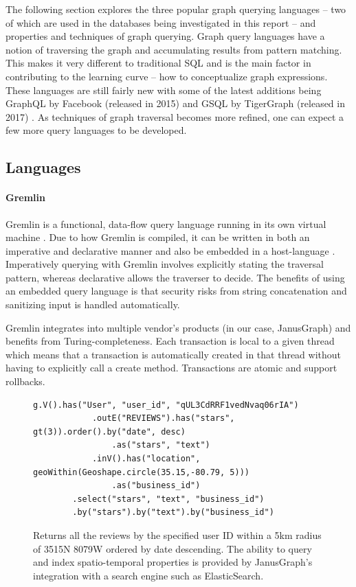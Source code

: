 The following section explores the three popular graph querying languages -- two of which are used in the databases being investigated in this report -- and properties and techniques of graph querying. Graph query languages have a notion of traversing the graph and accumulating results from pattern matching. This makes it very different to traditional SQL and is the main factor in contributing to the learning curve -- how to conceptualize graph expressions. These languages are still fairly new with some of the latest additions being GraphQL by Facebook (released in 2015) \cite{graphqlhome} and GSQL by TigerGraph (released in 2017) \cite{tgv1docs}. As techniques of graph traversal becomes more refined, one can expect a few more query languages to be developed.

\subsection{Languages}
\label{subsec:lang}

\paragraph{Gremlin}

Gremlin is a functional, data-flow query language running in its own virtual machine \cite{gremlin-tinkerpop}. Due to how Gremlin is compiled, it can be written in both an imperative and declarative manner and also be embedded in a host-language \cite{tinkerpop-docs}. Imperatively querying with Gremlin involves explicitly stating the traversal pattern, whereas declarative allows the traverser to decide. The benefits of using an embedded query language is that security risks from string concatenation and sanitizing input is handled automatically.

Gremlin integrates into multiple vendor's products (in our case, JanusGraph) and benefits from Turing-completeness. Each transaction is local to a given thread which means that a transaction is automatically created in that thread without having to explicitly call a create method. Transactions are atomic and support rollbacks.

\begin{figure}[h]
    \centering
    \begin{lstlisting}[language=gremlin]
    g.V().has("User", "user_id", "qUL3CdRRF1vedNvaq06rIA")
            .outE("REVIEWS").has("stars", gt(3)).order().by("date", desc)
                .as("stars", "text")
            .inV().has("location", geoWithin(Geoshape.circle(35.15,-80.79, 5)))
                .as("business_id")
        .select("stars", "text", "business_id")
        .by("stars").by("text").by("business_id")
    \end{lstlisting}
    \caption{Returns all the reviews by the specified user ID within a 5km radius of 35\degree 15N 80\degree 79W ordered by date descending. The ability to query and index spatio-temporal properties is provided by JanusGraph's integration with a search engine such as ElasticSearch.}
    \label{lst:gremlin-example-1}
\end{figure}

